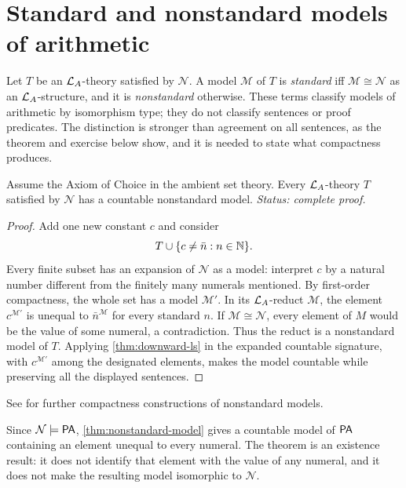 \section{Standard and nonstandard models of arithmetic}
\label{sec:arithmetic-coding-02}
\label{sec:nonstandard-arithmetic}

\begin{definition}
\label{def:nonstandard-model}
Let \(T\) be an \(\mathcal{L}_A\)-theory satisfied by \(\mathcal N\).  A model
\(\mathcal M\) of \(T\) is \emph{standard} iff
\(\mathcal M\cong\mathcal N\) as an \(\mathcal{L}_A\)-structure, and it is
\emph{nonstandard} otherwise.  These terms classify models of arithmetic by
isomorphism type; they do not classify sentences or proof predicates.  The
distinction is stronger than agreement on all sentences, as the theorem and
exercise below show, and it is needed to state what compactness produces.
\end{definition}

\begin{theorem}
\label{thm:nonstandard-model}
Assume the Axiom of Choice in the ambient set theory.  Every \(\mathcal{L}_A\)-theory
\(T\) satisfied by \(\mathcal N\) has a countable
nonstandard model.
\textit{Status: complete proof.}
\end{theorem}

\begin{proof}
Add one new constant \(c\) and consider
\[
  T\cup\{c\ne\bar n:n\in\mathbb{N}\}.
\]
Every finite subset has an expansion of \(\mathcal N\) as a model: interpret
\(c\) by a natural number different from the finitely many numerals mentioned.
By first-order compactness, the whole set has a model \(\mathcal M'\).  In its
\(\mathcal{L}_A\)-reduct \(\mathcal M\), the element \(c^{\mathcal M'}\) is unequal
to \(\bar n^{\mathcal M}\) for every standard \(n\).  If
\(\mathcal M\cong\mathcal N\), every element of \(M\) would be the value of
some numeral, a contradiction.  Thus the reduct is a nonstandard model of
\(T\).  Applying \cref{thm:downward-ls} in the expanded countable signature,
with \(c^{\mathcal M'}\) among the designated elements, makes the model
countable while preserving all the displayed sentences.
\end{proof}

See \cite{Hodges1993,Marker2002} for further compactness constructions of
nonstandard models.

\begin{example}
Since \(\mathcal N\models\mathsf{PA}\), \cref{thm:nonstandard-model} gives a
countable model of \(\mathsf{PA}\) containing an element unequal to every numeral.
The theorem is an existence result: it does not identify that element with
the value of any numeral, and it does not make the resulting model
isomorphic to
\(\mathcal N\).
\end{example}

